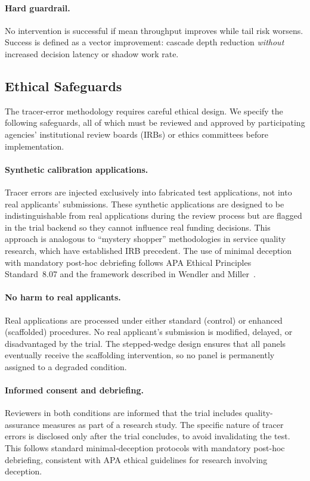 \documentclass[runningheads]{llncs}
\begin{document}
\paragraph{Hard guardrail.}
No intervention is successful if mean throughput improves while tail risk worsens. Success is defined as a vector improvement: cascade depth reduction \emph{without} increased decision latency or shadow work rate.

\subsection{Ethical Safeguards}
\label{sec:ethics}

The tracer-error methodology requires careful ethical design. We specify the following safeguards, all of which must be reviewed and approved by participating agencies' institutional review boards (IRBs) or ethics committees before implementation.

\paragraph{Synthetic calibration applications.} Tracer errors are injected exclusively into fabricated test applications, not into real applicants' submissions. These synthetic applications are designed to be indistinguishable from real applications during the review process but are flagged in the trial backend so they cannot influence real funding decisions. This approach is analogous to ``mystery shopper'' methodologies in service quality research, which have established IRB precedent. The use of minimal deception with mandatory post-hoc debriefing follows APA Ethical Principles Standard~8.07 and the framework described in Wendler and Miller~\cite{wendler2004deception}.

\paragraph{No harm to real applicants.} Real applications are processed under either standard (control) or enhanced (scaffolded) procedures. No real applicant's submission is modified, delayed, or disadvantaged by the trial. The stepped-wedge design ensures that all panels eventually receive the scaffolding intervention, so no panel is permanently assigned to a degraded condition.

\paragraph{Informed consent and debriefing.} Reviewers in both conditions are informed that the trial includes quality-assurance measures as part of a research study. The specific nature of tracer errors is disclosed only after the trial concludes, to avoid invalidating the test. This follows standard minimal-deception protocols with mandatory post-hoc debriefing, consistent with APA ethical guidelines for research involving deception.
\end{document}
